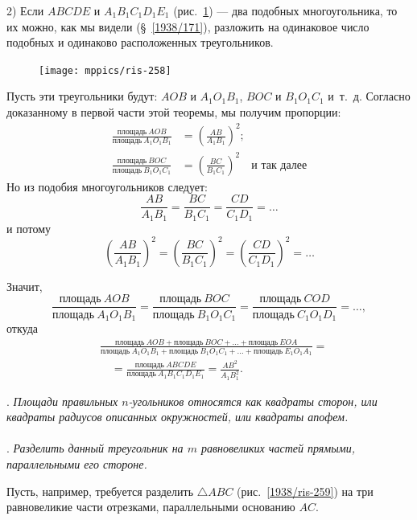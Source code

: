\documentclass[twoside]{book}
\begin{document}
2) Если $ABCDE$ и $A_1B_1C_1D_1E_1$ (рис.~\ref{1938/ris-258}) — два подобных многоугольника, то их можно, как мы видели (§~\ref{1938/171}), разложить на одинаковое число подобных и одинаково расположенных треугольников.

\begin{figure}[h]
\centering
\texttt{[image: mppics/ris-258]}
\caption{}\label{1938/ris-258}
\end{figure}

Пусть эти треугольники будут:
$AOB$ и $A_1O_1B_1$, $BOC$ и $B_1O_1C_1$ и~т.~д.
Согласно доказанному в первой части этой теоремы, мы получим пропорции:
\begin{align*}
\frac{\text{площадь}~AOB}{\text{площадь}~A_1O_1B_1}&=\left(\frac{AB}{A_1B_1}\right)^2;
\\
\frac{\text{площадь}~BOC}{\text{площадь}~B_1O_1C_1}&=\left(\frac{BC}{B_1C_1}\right)^2\quad\text{и так далее}
\end{align*}
Но из подобия многоугольников следует:
\[\frac{AB}{A_1B_1}=\frac{BC}{B_1C_1}=\frac{CD}{C_1D_1}=\dots\]
и потому
\[\left(\frac{AB}{A_1B_1}\right)^2=\left(\frac{BC}{B_1C_1}\right)^2=\left(\frac{CD}{C_1D_1}\right)^2=\dots\]

Значит,
\[\frac{\text{площадь}~AOB}{\text{площадь}~A_1O_1B_1}
=
\frac{\text{площадь}~BOC}{\text{площадь}~B_1O_1C_1}
=
\frac{\text{площадь}~COD}{\text{площадь}~C_1O_1D_1}=\dots,\]
откуда
\begin{align*}
&\frac{\text{площадь}~AOB+\text{площадь}~BOC+\dots+\text{площадь}~EOA}{\text{площадь}~A_1O_1B_1+\text{площадь}~B_1O_1C_1+\dots+\text{площадь}~E_1O_1A_1}
=
\\
&\quad=
\frac{\text{площадь}~ABCDE}{\text{площадь}~A_1B_1C_1D_1E_1}
=\frac{AB^2}{A_1B_1^2}.
\end{align*}

\smallskip
{}.
\emph{Площади правильных  $n$-угольников относятся как квадраты сторон, или квадраты радиусов описанных окружностей, или квадраты апофем.}

\paragraph{}\label{1938/261}
.
\emph{Разделить данный треугольник на $m$ равновеликих частей прямыми, параллельными его стороне.}

Пусть, например, требуется разделить $\triangle ABC$ (рис.~\ref{1938/ris-259}) на три равновеликие части отрезками, параллельными основанию $AC$.
\end{document}
